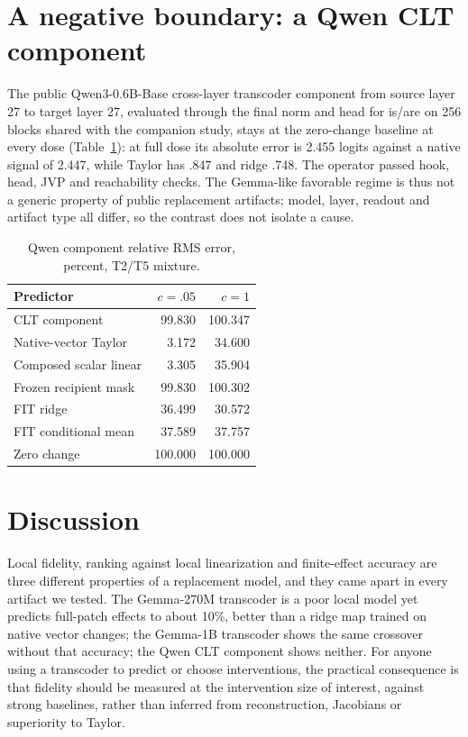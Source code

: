 \documentclass[11pt]{article}
\begin{document}
\section{A negative boundary: a Qwen CLT component}
The public Qwen3-0.6B-Base cross-layer transcoder component from source layer 27 to target layer 27, evaluated through the final norm and head for is/are on 256 blocks shared with the companion study, stays at the zero-change baseline at every dose (Table~\ref{tab:qwen}): at full dose its absolute error is 2.455 logits against a native signal of 2.447, while Taylor has .847 and ridge .748. The operator passed hook, head, JVP and reachability checks. The Gemma-like favorable regime is thus not a generic property of public replacement artifacts; model, layer, readout and artifact type all differ, so the contrast does not isolate a cause.

\begin{table}[ht]\centering\small
\begin{tabular}{lrr}\toprule Predictor & $c=.05$ & $c=1$\\\midrule
CLT component & 99.830 & 100.347\\
Native-vector Taylor & 3.172 & 34.600\\
Composed scalar linear & 3.305 & 35.904\\
Frozen recipient mask & 99.830 & 100.302\\
FIT ridge & 36.499 & 30.572\\
FIT conditional mean & 37.589 & 37.757\\
Zero change & 100.000 & 100.000\\\bottomrule\end{tabular}
\caption{Qwen component relative RMS error, percent, T2/T5 mixture.}\label{tab:qwen}
\end{table}

\section{Discussion}
Local fidelity, ranking against local linearization and finite-effect accuracy are three different properties of a replacement model, and they came apart in every artifact we tested. The Gemma-270M transcoder is a poor local model yet predicts full-patch effects to about 10\%, better than a ridge map trained on native vector changes; the Gemma-1B transcoder shows the same crossover without that accuracy; the Qwen CLT component shows neither. For anyone using a transcoder to predict or choose interventions, the practical consequence is that fidelity should be measured at the intervention size of interest, against strong baselines, rather than inferred from reconstruction, Jacobians or superiority to Taylor.
\end{document}
